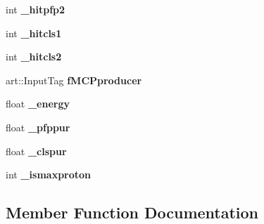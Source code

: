 \begin{DoxyCompactItemize}
\item 
int {\bfseries \+\_\+hitpfp2}\hypertarget{classProtonTruthStudies_a8deb32262f470e420b1f03c261d9fb96}{}\label{classProtonTruthStudies_a8deb32262f470e420b1f03c261d9fb96}

\item 
int {\bfseries \+\_\+hitcls1}\hypertarget{classProtonTruthStudies_aa605db03219af1d2821ae1caefabf509}{}\label{classProtonTruthStudies_aa605db03219af1d2821ae1caefabf509}

\item 
int {\bfseries \+\_\+hitcls2}\hypertarget{classProtonTruthStudies_a43d0b858cb8ee751e198320d9ba83bef}{}\label{classProtonTruthStudies_a43d0b858cb8ee751e198320d9ba83bef}

\item 
art\+::\+Input\+Tag {\bfseries f\+M\+C\+Pproducer}\hypertarget{classProtonTruthStudies_a3a3b9b5cbba52c2228525827ca5e2b9a}{}\label{classProtonTruthStudies_a3a3b9b5cbba52c2228525827ca5e2b9a}

\item 
float {\bfseries \+\_\+energy}\hypertarget{classProtonTruthStudies_a11f79059ea4565bd0e269834f04df948}{}\label{classProtonTruthStudies_a11f79059ea4565bd0e269834f04df948}

\item 
float {\bfseries \+\_\+pfppur}\hypertarget{classProtonTruthStudies_a7948429959a80f19fb979ecd3fa5ac38}{}\label{classProtonTruthStudies_a7948429959a80f19fb979ecd3fa5ac38}

\item 
float {\bfseries \+\_\+clspur}\hypertarget{classProtonTruthStudies_a46193c1357f035c06fe76881b8145b75}{}\label{classProtonTruthStudies_a46193c1357f035c06fe76881b8145b75}

\item 
int {\bfseries \+\_\+ismaxproton}\hypertarget{classProtonTruthStudies_af07861f891c9dacdda892a4c818138be}{}\label{classProtonTruthStudies_af07861f891c9dacdda892a4c818138be}

\end{DoxyCompactItemize}


\subsection{Member Function Documentation}
